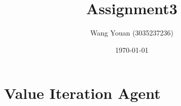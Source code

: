 \documentclass[12pt,a4paper]{article}
\title{Assignment3}
\author{Wang Youan (3035237236)}
\date{\today}
\begin{document}
	\maketitle
	\section{Value Iteration Agent}
\end{document}
